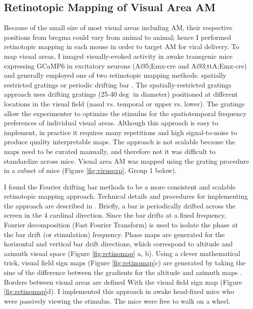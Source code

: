 \subsection{Retinotopic Mapping of Visual Area AM}
Because of the small size of most visual areas including AM, their respective positions from bregma could vary from animal to animal; hence I performed retinotopic mapping in each mouse in order to target AM for viral delivery. To map visual areas, I imaged visually-evoked activity in awake transgenic mice expressing GCaMP6 in excitatory neurons (Ai95;Emx-cre and Ai93;ttA;Emx-cre) and generally employed one of two retinotopic mapping methods: spatially restricted gratings \parencite{Gias2005,Andermann2011} or periodic drifting bar \parencite{Sereno1995,Kalatsky2003}. The spatially-restricted gratings approach uses drifting gratings (25-40$\deg$ in diameter) positioned at different locations in the visual field (nasal vs. temporal or upper vs. lower). The gratings allow the experimenter to optimize the stimulus for the spatiotemporal frequency preferences of individual visual areas. Although this approach is easy to implement, in practice it requires many repetitions and high signal-to-noise to produce quality interpretable maps. The approach is not scalable because the maps need to be curated manually, and therefore not it was difficult to standardize across mice. Visual area AM was mapped using the grating procedure in a subset of mice (Figure \ref{fig:virusexp}, Group 1 below). \par 

I found the Fourier drifting bar methods to be a more consistent and scalable retinotopic mapping approach. Technical details and procedures for implementing the approach are described in \parencite{Kalatsky2003,Juavinett2016}. Briefly, a bar is periodically drifted across the screen in the 4 cardinal direction. Since the bar drifts at a fixed frequency, 
Fourier decomposition (Fast Fourier Transform) is used to isolate the phase at the bar drift (or stimulation) frequency. Phase maps are generated for the horizontal and vertical bar drift directions, which correspond to altitude and azimuth visual space (Figure \ref{fig:retinomap} a, b). Using a clever mathematical trick, visual field sign maps (Figure \ref{fig:retinomap}c) are generated by taking the sine of the difference between the gradients for the altitude and azimuth maps \parencite{Sereno1994,Garrett2014}. Borders between visual areas are defined With the visual field sign map (Figure \ref{fig:retinomap}d). I implemented this approach in awake head-fixed mice who were passively viewing the stimulus. The mice were free to walk on a wheel. \par 

